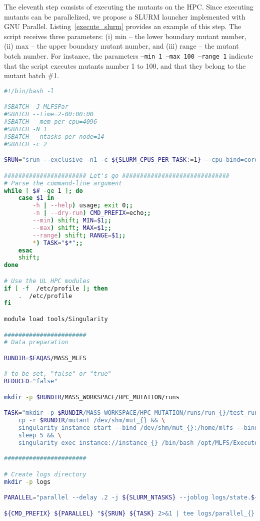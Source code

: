 The eleventh step consists of executing the mutants on the HPC. Since executing mutants can be parallelized, we propose a SLURM launcher implemented with GNU Parallel. Listing~\ref{execute_slurm} provides an example of this step.
The script receives three parameters: (i) min -- the lower boundary mutant number, (ii) max -- the upper boundary mutant number, and (iii) range -- the mutant batch number. For instance, the parameters \texttt{--min 1 --max 100 --range 1} indicate that the script executes mutants number 1 to 100, and that they belong to the mutant batch \#1.

\begin{lstlisting}[language=bash, label=execute_slurm ,caption=Example of the SLURM launcher for the execution of mutants on the HPC.]
#!/bin/bash -l

#SBATCH -J MLFSPar
#SBATCH --time=2-00:00:00
#SBATCH --mem-per-cpu=4096
#SBATCH -N 1
#SBATCH --ntasks-per-node=14
#SBATCH -c 2

SRUN="srun --exclusive -n1 -c ${SLURM_CPUS_PER_TASK:=1} --cpu-bind=cores"

####################### Let's go ##############################
# Parse the command-line argument
while [ $# -ge 1 ]; do
    case $1 in
        -h | --help) usage; exit 0;;
        -n | --dry-run) CMD_PREFIX=echo;;
        --min) shift; MIN=$1;;
        --max) shift; MAX=$1;;
        --range) shift; RANGE=$1;;
        *) TASK="$*";;
    esac
    shift;
done

# Use the UL HPC modules
if [ -f  /etc/profile ]; then
    .  /etc/profile
fi

module load tools/Singularity

#######################
# Data preparation

RUNDIR=$FAQAS/MASS_MLFS

# to be set, "false" or "true"
REDUCED="false"

mkdir -p $RUNDIR/MASS_WORKSPACE/HPC_MUTATION/runs

TASK="mkdir -p $RUNDIR/MASS_WORKSPACE/HPC_MUTATION/runs/run_{}/test_runs && \
    cp -r $RUNDIR/mutant /dev/shm/mut_{} && \
    singularity instance start --bind /dev/shm/mut_{}:/home/mlfs --bind $RUNDIR/MASS_WORKSPACE/HPC_MUTATION/runs/run_{}/test_runs:/home/mlfs/test_runs --bind $FAQAS/srcirorfaqas:/opt/srcirorfaqas --bind $RUNDIR/MASS_WORKSPACE:/opt/MLFS --bind $FAQAS/MASS_MLFS/unit-test-suite:/home/mlfs/unit-test-suite --bind $FAQAS/MASS_MLFS/unit-reports:/home/mlfs/unit-reports $FAQAS/MASS_MLFS/blts.sif instance_{} && \
    sleep 5 && \
    singularity exec instance://instance_{} /bin/bash /opt/MLFS/ExecuteMutants_HPC.sh {} $REDUCED"

#######################

# Create logs directory
mkdir -p logs

PARALLEL="parallel --delay .2 -j ${SLURM_NTASKS} --joblog logs/state.${RANGE}.parallel.log --resume"

${CMD_PREFIX} ${PARALLEL} "${SRUN} ${TASK} 2>&1 | tee logs/parallel_{}.log && ${SRUN} singularity instance stop instance_{} && rm -rf /dev/shm/mut_{}" ::: $(seq ${MIN} ${MAX})
\end{lstlisting}


